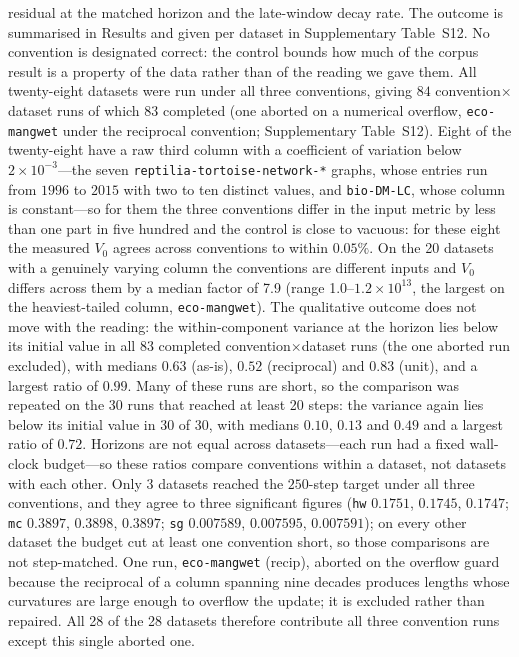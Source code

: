 \documentclass[11pt]{article}
\begin{document}
residual at the matched horizon and the late-window decay rate. The outcome is summarised in Results and given per dataset in Supplementary Table~S12. No convention is designated correct: the control bounds how much of the corpus result is a property of the data rather than of the reading we gave them. All twenty-eight datasets were run under all three conventions, giving $84$ convention$\times$dataset runs of which $83$ completed (one aborted on a numerical overflow, \texttt{eco-mangwet} under the reciprocal convention; Supplementary Table~S12). Eight of the twenty-eight have a raw third column with a coefficient of variation below $2\times10^{-3}$---the seven \texttt{reptilia-tortoise-network-*} graphs, whose entries run from $1996$ to $2015$ with two to ten distinct values, and \texttt{bio-DM-LC}, whose column is constant---so for them the three conventions differ in the input metric by less than one part in five hundred and the control is close to vacuous: for these eight the measured $V_0$ agrees across conventions to within $0.05\%$. On the 20 datasets with a genuinely varying column the conventions are different inputs and $V_0$ differs across them by a median factor of 7.9 (range 1.0--$1.2\times10^{13}$, the largest on the heaviest-tailed column, \texttt{eco-mangwet}). The qualitative outcome does not move with the reading: the within-component variance at the horizon lies below its initial value in all 83 completed convention$\times$dataset runs (the one aborted run excluded), with medians $0.63$ (as-is), $0.52$ (reciprocal) and $0.83$ (unit), and a largest ratio of $0.99$. Many of these runs are short, so the comparison was repeated on the 30 runs that reached at least 20 steps: the variance again lies below its initial value in 30 of 30, with medians $0.10$, $0.13$ and $0.49$ and a largest ratio of $0.72$. Horizons are not equal across datasets---each run had a fixed wall-clock budget---so these ratios compare conventions within a dataset, not datasets with each other. Only 3 datasets reached the $250$-step target under all three conventions, and they agree to three significant figures (\texttt{hw} $0.1751$, $0.1745$, $0.1747$; \texttt{mc} $0.3897$, $0.3898$, $0.3897$; \texttt{sg} $0.007589$, $0.007595$, $0.007591$); on every other dataset the budget cut at least one convention short, so those comparisons are not step-matched. One run, \texttt{eco-mangwet} (recip), aborted on the overflow guard because the reciprocal of a column spanning nine decades produces lengths whose curvatures are large enough to overflow the update; it is excluded rather than repaired. All 28 of the 28 datasets therefore contribute all three convention runs except this single aborted one.
\end{document}
